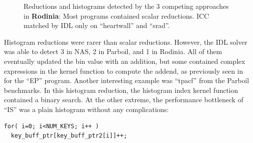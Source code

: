 \begin{figure}[p]
  \caption{Reductions and histograms detected by the 3 competing approaches
           in {\bf Rodinia}:
           Most programs contained scalar reductions.
           ICC matched by IDL only on ``heartwall'' and ``srad''.}
    \label{rodinia_spotted}
\end{figure}

    Histogram reductions were rarer than scalar reductions.
    However, the IDL solver was able to detect 3 in NAS, 2 in Parboil, and 1 in
    Rodinia.
    All of them eventually updated the bin value with an addition, but some
    contained complex expressions in the kernel function to compute the addend,
    as previously seen in  for the ``EP''
    program.
    Another interesting example was ``tpacf'' from the Parboil benchmarks.
    In this histogram reduction, the histogram index kernel function contained a
    binary search.
    At the other extreme, the performance bottleneck of ``IS'' was a plain
    histogram without any complications:
\begin{lstlisting}[language=MyCpp]
for( i=0; i<NUM_KEYS; i++ )
  key_buff_ptr[key_buff_ptr2[i]]++;
\end{lstlisting}

